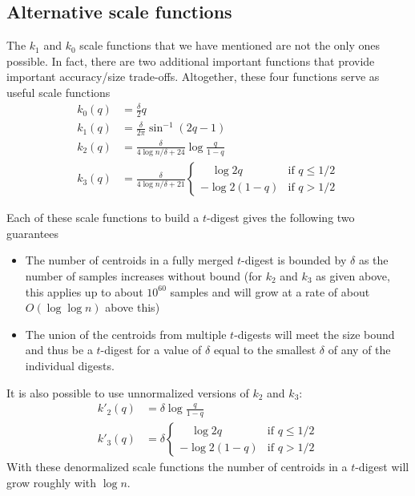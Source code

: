 \documentclass[11pt]{amsart}
\begin{document}
\subsection{Alternative scale functions}
The $k_1$ and $k_0$ scale functions that we have mentioned are not the only ones possible. In fact, there are two additional important functions that provide important accuracy/size trade-offs. Altogether, these four functions serve as useful scale functions
\[
\begin{aligned}
k_0(q) &= \frac \delta 2 q \\
k_1(q) &= \frac \delta {2\pi}  \sin^{-1}(2q-1)   \\
k_2(q) &= \frac \delta {4 \log n/\delta + 24} \log {\frac q {1-q}} \\
k_3(q) &= \frac \delta {4\log n/\delta + 21}\begin{cases}
\quad \log 2q & \text{if  } q \le 1/2 \\
- \log 2(1-q) & \text{if  } q > 1/2
\end{cases}
\end{aligned}
\]

Each of these scale functions to build a $t$-digest gives the following two guarantees
\begin{itemize}
\item
The number of centroids in a fully merged $t$-digest is bounded by $\delta$ as the number of samples increases without bound (for $k_2$ and $k_3$ as given above, this applies up to about $10^{60}$ samples and will grow at a rate of about $O(\log \log n)$ above this)
\item
The union of the centroids from multiple $t$-digests will meet the size bound and thus be a $t$-digest for a value of $\delta$ equal to the smallest $\delta$ of any of the individual digests.
\end{itemize}

It is also possible to use unnormalized versions of $k_2$ and $k_3$:
\[
\begin{aligned}
k'_2(q) &=  \delta  \log {\frac q {1-q}} \\
k'_3(q) &=  \delta \begin{cases}
\quad \log 2q & \text{if  } q \le 1/2 \\
- \log 2(1-q) & \text{if  } q > 1/2
\end{cases}
\end{aligned}
\]
With these denormalized scale functions the number of centroids in a $t$-digest will grow roughly with $\log n$.
\end{document}
